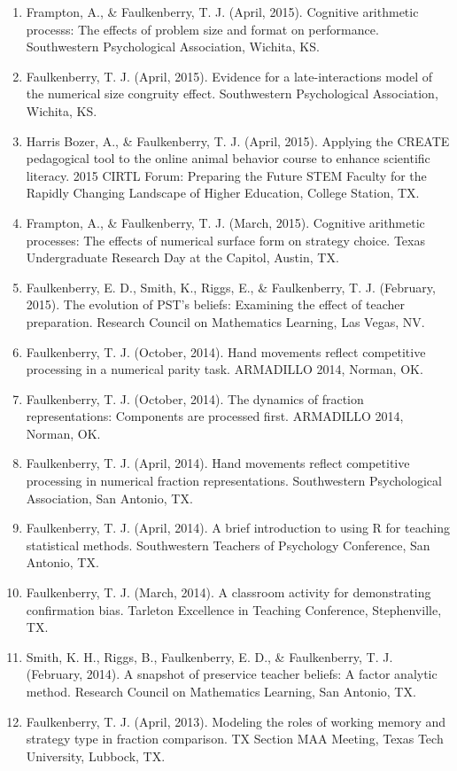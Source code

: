 \documentclass[article,10pt]{article}
\begin{document}
\begin{enumerate}
\item Frampton, A., \& Faulkenberry, T. J. (April, 2015). Cognitive arithmetic processs: The effects of problem size and format on performance. Southwestern Psychological Association, Wichita, KS.
\item Faulkenberry, T. J. (April, 2015). Evidence for a late-interactions model of the numerical size congruity effect. Southwestern Psychological Association, Wichita, KS.
\item Harris Bozer, A., \& Faulkenberry, T. J. (April, 2015). Applying the CREATE pedagogical tool to the online animal behavior course to enhance scientific literacy.  2015 CIRTL Forum: Preparing the Future STEM Faculty for the Rapidly Changing Landscape of Higher Education, College Station, TX.
\item Frampton, A., \& Faulkenberry, T. J. (March, 2015). Cognitive arithmetic processes: The effects of numerical surface form on strategy choice. Texas Undergraduate Research Day at the Capitol, Austin, TX.
\item Faulkenberry, E. D., Smith, K., Riggs, E., \& Faulkenberry, T. J. (February, 2015). The evolution of PST’s beliefs: Examining the effect of teacher preparation. Research Council on Mathematics Learning, Las Vegas, NV.
\item Faulkenberry, T. J. (October, 2014).  Hand movements reflect competitive processing in a numerical parity task. ARMADILLO 2014, Norman, OK.
\item Faulkenberry, T. J. (October, 2014). The dynamics of fraction representations: Components are processed first. ARMADILLO 2014, Norman, OK.
\item Faulkenberry, T. J. (April, 2014). Hand movements reflect competitive processing in numerical fraction representations. Southwestern Psychological Association, San Antonio, TX.
\item Faulkenberry, T. J. (April, 2014). A brief introduction to using R for teaching statistical methods. Southwestern Teachers of Psychology Conference, San Antonio, TX.
\item Faulkenberry, T. J. (March, 2014). A classroom activity for demonstrating confirmation bias. Tarleton Excellence in Teaching Conference, Stephenville, TX.
\item Smith, K. H., Riggs, B., Faulkenberry, E. D., \& Faulkenberry, T. J. (February, 2014). A snapshot of preservice teacher beliefs: A factor analytic method. Research Council on Mathematics Learning, San Antonio, TX.
\item Faulkenberry, T. J. (April, 2013). Modeling the roles of working memory and strategy type in fraction comparison. TX Section MAA Meeting, Texas Tech University, Lubbock, TX.

\end{enumerate}
\end{document}
